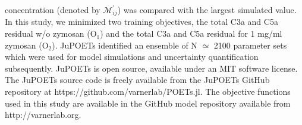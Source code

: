 \documentclass[12pt]{article}
\makeatletter
\renewcommand\subsubsection{\@startsection
	{subsubsection}{2}{0mm}
	{-0.05in}
	{-0.5\baselineskip}
	{\normalfont\normalsize\itshape}}
\makeatother
\begin{document}
concentration (denoted by $\mathcal{M}^{\prime}_{ij}$) was compared with the largest simulated value.
In this study, we minimized two training objectives, the total C3a and C5a residual w/o zymosan (O$_{1}$) and the total C3a and C5a residual for 1 mg/ml zymosan (O$_{2}$).
JuPOETs identified an ensemble of N $\simeq$ 2100 parameter sets which were used for model simulations and uncertainty quantification subsequently.
JuPOETs is open source, available under an MIT software license.
The JuPOETs source code is freely available from the JuPOETs GitHub repository at https://github.com/varnerlab/POETs.jl.
The objective functions used in this study are available in the GitHub model repository available from http://varnerlab.org.


%
\end{document}
